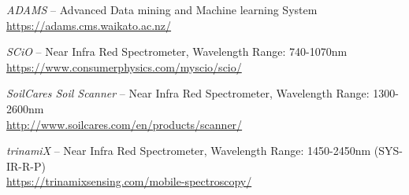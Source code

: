 
\begin{thebibliography}{999}

		\textit{ADAMS} -- Advanced Data mining and Machine learning System \\
		\url{https://adams.cms.waikato.ac.nz/}{}

		\textit{SCiO} -- Near Infra Red Spectrometer,
		Wavelength Range: 740-1070nm \\
		\url{https://www.consumerphysics.com/myscio/scio/}{}

		\textit{SoilCares Soil Scanner} -- Near Infra Red Spectrometer,
		Wavelength Range: 1300-2600nm \\
		\url{http://www.soilcares.com/en/products/scanner/}{}

		\textit{trinamiX} -- Near Infra Red Spectrometer,
		Wavelength Range: 1450-2450nm (SYS-IR-R-P) \\
		\url{https://trinamixsensing.com/mobile-spectroscopy/}{}

\end{thebibliography}
